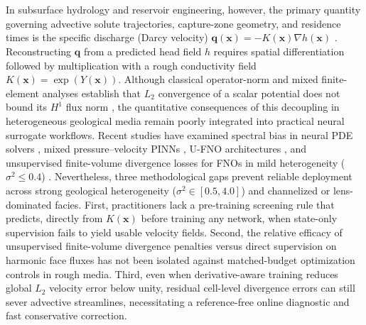 \documentclass[preprint,12pt,authoryear]{elsarticle}
\begin{document}
In subsurface hydrology and reservoir engineering, however, the primary quantity governing advective solute trajectories, capture-zone geometry, and residence times is the specific discharge (Darcy velocity) $\mathbf{q}(\mathbf{x}) = -K(\mathbf{x})\nabla h(\mathbf{x})$ \citep{raviart1977mixed,pollock1988,dagan1989flow,rubin2003applied}. Reconstructing $\mathbf{q}$ from a predicted head field $\hat{h}$ requires spatial differentiation followed by multiplication with a rough conductivity field $K(\mathbf{x}) = \exp(Y(\mathbf{x}))$. Although classical operator-norm and mixed finite-element analyses establish that $L_2$ convergence of a scalar potential does not bound its $H^1$ flux norm \citep{raviart1977mixed,ern2010posteriori}, the quantitative consequences of this decoupling in heterogeneous geological media remain poorly integrated into practical neural surrogate workflows. Recent studies have examined spectral bias in neural PDE solvers \citep{rahaman2019bias,fuks2020limits,wang2021grad,krishnapriyan2021,wang2022nntk,grossmann2024fem}, mixed pressure--velocity PINNs \citep{jagtap2020cpinn,yu2022grad,alhubail2024weight,massbal2024}, U-FNO architectures \citep{wen2022ufno}, and unsupervised finite-volume divergence losses for FNOs in mild heterogeneity ($\sigma^2 \le 0.4$) \citep{awr2025fvfno}. Nevertheless, three methodological gaps prevent reliable deployment across strong geological heterogeneity ($\sigma^2 \in [0.5, 4.0]$) and channelized or lens-dominated facies. First, practitioners lack a pre-training screening rule that predicts, directly from $K(\mathbf{x})$ before training any network, when state-only supervision fails to yield usable velocity fields. Second, the relative efficacy of unsupervised finite-volume divergence penalties versus direct supervision on harmonic face fluxes has not been isolated against matched-budget optimization controls in rough media. Third, even when derivative-aware training reduces global $L_2$ velocity error below unity, residual cell-level divergence errors can still sever advective streamlines, necessitating a reference-free online diagnostic and fast conservative correction.
\end{document}
